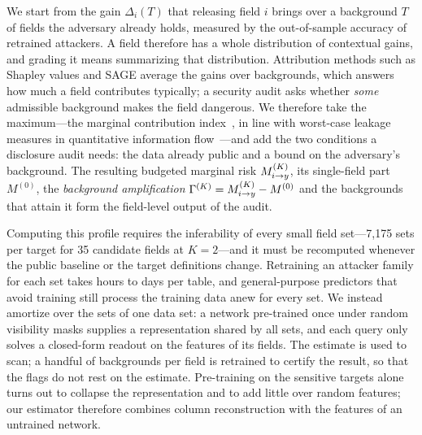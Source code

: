 We start from the gain $\Delta_i(T)$ that releasing field $i$ brings over a background $T$ of fields the adversary already
holds, measured by the out-of-sample accuracy of retrained attackers. A field therefore has a whole distribution of
contextual gains, and grading it means summarizing that distribution. Attribution methods such as Shapley values and SAGE
average the gains over backgrounds, which answers how much a field contributes typically; a security audit asks whether
\emph{some} admissible background makes the field dangerous. We therefore take the maximum---the marginal contribution
index~\cite{catav2021mci}, in line with worst-case leakage measures in quantitative information
flow~\cite{smith2009qif,alvim2012gleakage}---and add the two conditions a disclosure audit needs: the data already public and a
bound on the adversary's background. The resulting budgeted marginal risk $M^{(K)}_{i \to y}$, its single-field part $M^{(0)}$, the
\emph{background amplification} $\Gamma^{(K)}=M^{(K)}_{i \to y}-M^{(0)}$ and the backgrounds that attain it form the field-level output of
the audit.

Computing this profile requires the inferability of every small field set---7,175 sets per target for 35 candidate fields at
$K=2$---and it must be recomputed whenever the public baseline or the target definitions change. Retraining an attacker family
for each set takes hours to days per table, and general-purpose predictors that avoid training still process the training
data anew for every set. We instead amortize over the sets of one data set: a network pre-trained once under random
visibility masks supplies a representation shared by all sets, and each query only solves a closed-form readout on the
features of its fields. The estimate is used to scan; a handful of backgrounds per field is retrained to certify the result,
so that the flags do not rest on the estimate. Pre-training on the sensitive targets alone turns out to collapse the
representation and to add little over random features; our estimator therefore combines column reconstruction with the
features of an untrained network.

